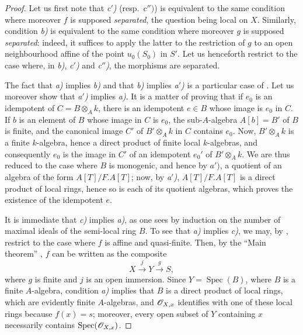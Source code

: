 \begin{proof}
Let us first note that \emph{c$'$)} (resp.\ $c'')$) is equivalent to the same condition where moreover $f$ is supposed \emph{separated}, the question being local on $X$.
Similarly, condition \emph{b)} is equivalent to the same condition where moreover $g$ is supposed \emph{separated}:
indeed, it suffices to apply the latter to the restriction of $g$ to an open neighbourhood affine of the point $u_0(S_0)$ in $S'$.
Let us henceforth restrict to the case where, in \emph{b)}, \emph{c$'$)} and \emph{c$''$)}, the morphisms are separated.

The fact that \emph{a)} implies \emph{b)} and that \emph{b)} implies \emph{a$'$)} is a particular case of .
Let us moreover show that \emph{a$'$)} implies \emph{a)}.
It is a matter of proving that if $e_0$ is an idempotent of $C=B\otimes_A k$, there is an idempotent $e\in B$ whose image is $e_0$ in $C$.
If $b$ is an element of $B$ whose image in $C$ is $e_0$, the sub-$A$-algebra $A[b]=B'$ of $B$ is finite, and the canonical image $C'$ of $B'\otimes_A k$ in $C$ contains $e_0$.
Now, $B'\otimes_A k$ is a finite $k$-algebra, hence a direct product of finite local $k$-algebras, and consequently $e_0$ is the image in $C'$ of an idempotent $e_0'$ of $B'\otimes_A k$.
We are thus reduced to the case where $B$ is monogenic, and hence by $a')$, a quotient of an algebra of the form $A[T]/F.A[T]$;
now, by \emph{a$'$)}, $A[T]/F.A[T]$ is a direct product of local rings, hence so is each of its quotient algebras, which proves the existence of the idempotent $e$.

It is immediate that \emph{c)} implies \emph{a)}, as one sees by induction on the number of maximal ideals of the semi-local ring $B$.
To see that \emph{a)} implies \emph{c)}, we may, by , restrict to the case where $f$ is affine and quasi-finite.
Then, by the ``Main theorem'' , $f$ can be written as the composite
\[
X\xrightarrow{j}Y\xrightarrow{g}S,
\]
where $g$ is finite and $j$ is an open immersion.
Since $Y=\operatorname{Spec}(B)$, where $B$ is a finite $A$-algebra, condition \emph{a)} implies that $B$ is a direct product of local rings, which are evidently finite $A$-algebras, and $\mathscr{O}_{X,x}$ identifies with one of these local rings because $f(x)=s$;
moreover, every open subset of $Y$ containing $x$ necessarily contains $\operatorname{Spec}(\mathscr{O}_{X,x})$.


\end{proof}
